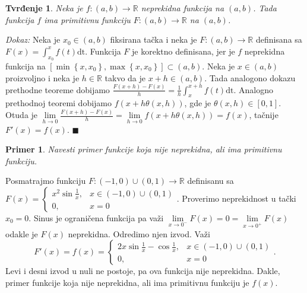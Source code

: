 \documentclass{article}
\newtheorem{tvr}{Tvrđenje}[section]
\newtheorem{prim}{Primer}[section]
\begin{document}
\begin{tvrbox}
    \label{tvrđenje_2.1}
    \begin{tvr}
        Neka je $f: \left(a, b\right) \longrightarrow \mathbb{R}$ neprekidna funkcija na $\left(a,b\right)$. Tada funkcija $f$ ima primitivnu funkciju $F: \left(a,b\right)\longrightarrow\mathbb{R}$ na $\left(a, b\right)$.
    \end{tvr}
\end{tvrbox}
\textit{Dokaz:} Neka je $x_0\in\left(a, b\right)$ fiksirana tačka i neka je $F:\left(a, b\right) \longrightarrow \mathbb{R}$ definisana sa $F\left(x\right) = \displaystyle\int^x_{x_0} f\left(t\right)\text{dt}$.
Funkcija $F$ je korektno definisana, jer je $f$ neprekidna funkcija na $\left[\min\left\{x, x_0\right\}, \max\left\{x, x_0\right\}\right]\subset\left(a, b\right)$. Neka
je $x\in\left(a, b\right)$ proizvoljno i neka je $h\in\mathbb{R}$ takvo da je $x+h\in\left(a, b\right)$. Tada analogono dokazu prethodne teoreme dobijamo
$\displaystyle\frac{F\left(x+h\right)-F\left(x\right)}{h} = \frac{1}{h}\int^{x+h}_x f\left(t\right)\text{dt}$.
Analogno prethodnoj teoremi dobijamo $f\left(x+h\theta\left(x, h\right)\right)$, gde je $\theta\left(x, h\right)\in\left[0,1\right]$.
Otuda je $\displaystyle \lim\limits_{h\longrightarrow 0}\frac{F\left(x+h\right)-F\left(x\right)}{h} = \lim\limits_{h\longrightarrow 0} f\left(x+h\theta\left(x, h\right)\right) = f\left(x\right)$, tačnije
$F'\left(x\right) = f\left(x\right)$.
\null\hfill $\blacksquare$\par

\begin{primbox}
    \label{primer_2.4}
    \begin{prim}
        Navesti primer funkcije koja nije neprekidna, ali ima primitivnu funkciju.
    \end{prim}
    Posmatrajmo funkciju $F: \left(-1,0\right)\cup\left(0,1\right)\longrightarrow\mathbb{R}$ definisanu sa
    $F\left(x\right) = \begin{cases}
            x^2\sin\frac{1}{x}, & x\in\left(-1,0\right)\cup\left(0,1\right) \\
            0,                  & x = 0
        \end{cases}$.
    Proverimo neprekidnost u tački $x_0=0$. Sinus je ograničena funkcija pa važi
    $\lim\limits_{x\rightarrow 0^-}F\left(x\right)=0=\lim\limits_{x\rightarrow 0^+}F(x)$
    odakle je $F\left(x\right)$ neprekidna. Odredimo njen izvod. Važi $$F'\left(x\right)=f\left(x\right) = \begin{cases}
            2x\sin\frac{1}{x} - \cos\frac{1}{x}, & x\in\left(-1,0\right)\cup\left(0,1\right) \\
            0,                                   & x = 0
        \end{cases}.$$
    Levi i desni izvod u nuli ne postoje, pa ova funkcija nije neprekidna.
    Dakle, primer funkcije koja nije neprekidna, ali ima primitivnu funkciju je $f(x)$.
\end{primbox}
\end{document}
